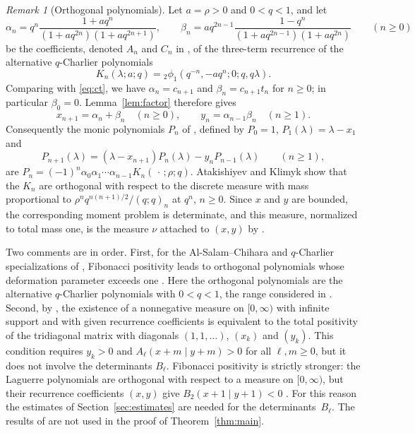 \documentclass[11pt]{amsart}
\theoremstyle{definition}
\theoremstyle{remark}
\newtheorem{remark}[theorem]{Remark}
\numberwithin{equation}{section}
\begin{document}
\begin{remark}[Orthogonal polynomials]
Let $a=\rho>0$ and $0<q<1$, and let
\[
\alpha_n=q^n\frac{1+aq^n}{(1+aq^{2n})(1+aq^{2n+1})},\qquad
\beta_n=aq^{2n-1}\frac{1-q^n}{(1+aq^{2n-1})(1+aq^{2n})}\qquad(n\ge0)
\]
be the coefficients, denoted $A_n$ and $C_n$ in \cite[Section~2]{AK03}, of the three-term recurrence of the alternative $q$-Charlier polynomials
\[
K_n(\lambda;a;q)={}_2\phi_1(q^{-n},-aq^n;0;q,q\lambda).
\]
Comparing with \eqref{eq:ct}, we have $\alpha_n=c_{n+1}$ and $\beta_n=c_{n+1}t_n$ for $n\ge0$; in particular $\beta_0=0$. Lemma~\ref{lem:factor} therefore gives
\[
x_{n+1}=\alpha_n+\beta_n\quad(n\ge0),\qquad y_n=\alpha_{n-1}\beta_n\quad(n\ge1).
\]
Consequently the monic polynomials $P_n$ of \cite[Theorem~7.1]{PS26}, defined by $P_0=1$, $P_1(\lambda)=\lambda-x_1$ and
\[
P_{n+1}(\lambda)=(\lambda-x_{n+1})P_n(\lambda)-y_nP_{n-1}(\lambda)\qquad(n\ge1),
\]
are $P_n=(-1)^n\alpha_0\alpha_1\cdots\alpha_{n-1}K_n(\,\cdot\,;\rho;q)$. Atakishiyev and Klimyk \cite[(10) and Proposition in Section~3]{AK03} show that the $K_n$ are orthogonal with respect to the discrete measure with mass proportional to $\rho^nq^{n(n+1)/2}/(q;q)_n$ at $q^n$, $n\ge0$. Since $x$ and $y$ are bounded, the corresponding moment problem is determinate, and this measure, normalized to total mass one, is the measure $\nu$ attached to $(x,y)$ by \cite[Theorem~7.1]{PS26}.

Two comments are in order. First, for the Al-Salam--Chihara and $q$-Charlier specializations of \cite{PS26}, Fibonacci positivity leads to orthogonal polynomials whose deformation parameter exceeds one \cite[Sections~1.3 and~10]{PS26}. Here the orthogonal polynomials are the alternative $q$-Charlier polynomials with $0<q<1$, the range considered in \cite{AK03}. Second, by \cite[Theorem~7.1]{PS26}, the existence of a nonnegative measure on $[0,\infty)$ with infinite support and with given recurrence coefficients is equivalent to the total positivity of the tridiagonal matrix with diagonals $(1,1,\dots)$, $(x_k)$ and $(y_k)$. This condition requires $y_k>0$ and $A_\ell(x+m\mid y+m)>0$ for all $\ell,m\ge0$, but it does not involve the determinants $B_\ell$. Fibonacci positivity is strictly stronger: the Laguerre polynomials are orthogonal with respect to a measure on $[0,\infty)$, but their recurrence coefficients $(x,y)$ give $B_2(x+1\mid y+1)<0$ \cite[Section~10.6.2]{PS26}. For this reason the estimates of Section~\ref{sec:estimates} are needed for the determinants~$B_\ell$. The results of \cite{AK03} are not used in the proof of Theorem~\ref{thm:main}.
\end{remark}
\end{document}
